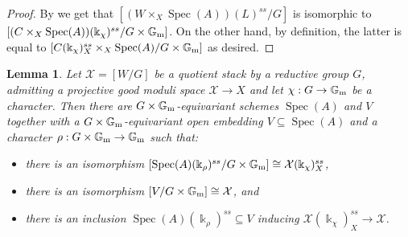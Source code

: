 \documentclass{amsart}
\newcommand{\bG}{\mathbb{G}}
\newcommand{\cB}{\mathcal{B}}
\newcommand{\cL}{\mathcal{L}}
\newcommand{\cS}{\mathcal{S}}
\newcommand{\cU}{\mathcal{U}}
\newcommand{\cX}{\mathcal{X}}
\newcommand{\cY}{\mathcal{Y}}
\newcommand{\spec}{\operatorname{Spec}}
\newcommand{\Gm}{\bG_{{\rm m}}}
\newtheorem{Lemma}[theorem]{Lemma}
\newtheorem{Prop}[theorem]{Proposition}
\theoremstyle{definition}
\newtheorem{Def}[theorem]{Definition}
\theoremstyle{definition}
\begin{document}
{\begin{proof}
    By  we get that $[(W\times_X \spec(A))(L)^{ss} /G]$ is isomorphic to $[(C\times_X \spec(A))(\Bbbk_\chi)^{ss}/G\times\Gm]$.
    On the other hand, by definition, the latter is equal to $[C(\Bbbk_\chi)^{ss}_X \times_X \spec(A) / G\times\Gm]$ as desired.
\end{proof}
\begin{Lemma}\label{lemma_L_otimes_epsilon_k_chi}
   Let $\cX=[W/G]$ be a quotient stack by a reductive group $G$, admitting a projective good moduli space $\cX\to X$ and let $\chi:G\to \Gm$ be a character.
    Then there are $G\times\Gm$-equivariant schemes $\spec(A)$ and $V$ together with a $G\times\Gm$-equivariant open embedding $V\subseteq \spec(A)$ and a character $\rho:G\times \Gm\to \Gm$ such that:
    \begin{itemize}
    \item there is an isomorphism $[\spec(A)(\Bbbk_\rho)^{ss}/G\times \Gm]\cong \cX(\Bbbk_\chi)^{ss}_X$, 
    \item  there is an isomorphism $[V/G\times \Gm]\cong \cX$, and 
    \item there is an inclusion $\spec(A)(\Bbbk_\rho)^{ss}\subseteq V$ inducing $\cX(\Bbbk_\chi)^{ss}_X\to \cX$.
\end{itemize}
\end{Lemma}


}
\end{document}
